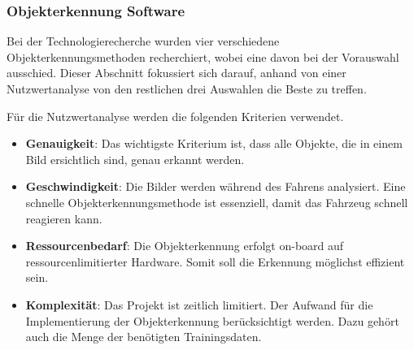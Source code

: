 \documentclass[../main.tex]{subfiles}
\begin{document}
\subsubsection{Objekterkennung Software}


Bei der Technologierecherche wurden vier verschiedene Objekterkennungsmethoden recherchiert, wobei eine davon bei der Vorauswahl ausschied. 
Dieser Abschnitt fokussiert sich darauf, anhand von einer Nutzwertanalyse von den restlichen drei Auswahlen die Beste zu treffen.

Für die Nutzwertanalyse werden die folgenden Kriterien verwendet.

\begin{itemize}
\item \textbf{Genauigkeit}: Das wichtigste Kriterium ist, dass alle Objekte, die in einem Bild ersichtlich sind, genau erkannt werden.
\item \textbf{Geschwindigkeit}: Die Bilder werden während des Fahrens analysiert. Eine schnelle Objekterkennungsmethode ist essenziell, damit das Fahrzeug schnell reagieren kann.
\item \textbf{Ressourcenbedarf}: Die Objekterkennung erfolgt on-board auf ressourcenlimitierter Hardware. Somit soll die Erkennung möglichst effizient sein.
\item \textbf{Komplexität}: Das Projekt ist zeitlich limitiert. Der Aufwand für die Implementierung der Objekterkennung berücksichtigt werden. Dazu gehört auch die Menge der benötigten Trainingsdaten.
\end{itemize}
\end{document}
